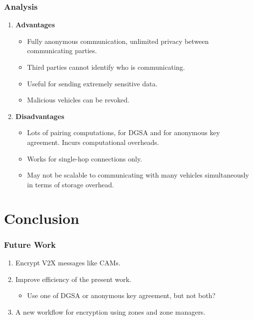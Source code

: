 \documentclass{beamer}
\begin{document}
    \begin{frame}
        \frametitle{Analysis}
        \begin{enumerate}
            \item<1-> \textbf{Advantages}
            \begin{itemize}
                \item Fully anonymous communication, unlimited privacy between
                communicating parties.
                \item Third parties cannot identify who is communicating.
                \item Useful for sending extremely sensitive data.
                \item Malicious vehicles can be revoked.
            \end{itemize}
            \item<2-> \textbf{Disadvantages}
            \begin{itemize}
                \item Lots of pairing computations, for DGSA and for anonymous
                key agreement. Incurs computational overheads.
                \item Works for single-hop connections only.
                \item May not be scalable to communicating with many vehicles
                simultaneously in terms of storage overhead.
            \end{itemize}
        \end{enumerate}
    \end{frame}

    \section{Conclusion}
    \begin{frame}
        \frametitle{Future Work}
        \begin{enumerate}
            \item<1-> Encrypt V2X messages like CAMs.
            \item<2-> Improve efficiency of the present work.
            \begin{itemize}
                \item Use one of DGSA or anonymous key agreement, but not both?
            \end{itemize}
            \item<3-> A new workflow for encryption using zones and zone managers.
        \end{enumerate}
    \end{frame}
\end{document}
